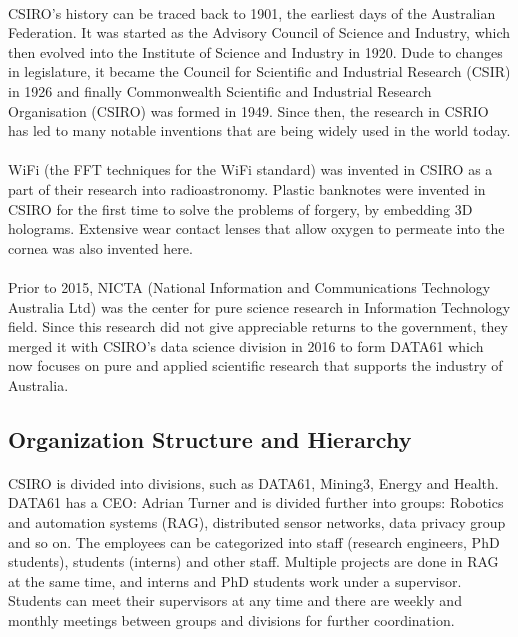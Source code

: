 \paragraph{}
CSIRO's history can be traced back to 1901, the earliest days of the Australian Federation. It was started as the Advisory Council of Science and Industry, which then evolved into the Institute of Science and Industry in 1920. Dude to changes in legislature, it became the Council for Scientific and Industrial Research (CSIR) in 1926 and finally Commonwealth Scientific and Industrial Research Organisation (CSIRO) was formed in 1949. Since then, the research in CSRIO has led to many notable inventions that are being widely used in the world today.

\paragraph{}
WiFi (the FFT techniques for the WiFi standard) was invented in CSIRO as a part of their research into radioastronomy. Plastic banknotes were invented in CSIRO for the first time to solve the problems of forgery, by embedding 3D holograms. Extensive wear contact lenses that allow oxygen to permeate into the cornea was also invented here. 

\paragraph{}
Prior to 2015, NICTA (National Information and Communications Technology Australia Ltd) was the center for pure science research in Information Technology field. Since this research did not give appreciable returns to the government, they merged it with CSIRO's data science division in 2016 to form DATA61 which now focuses on pure and applied scientific research that supports the industry of Australia.

\subsection{Organization Structure and Hierarchy}

\paragraph{}
CSIRO is divided into divisions, such as DATA61, Mining3, Energy and Health. DATA61 has a CEO: Adrian Turner and is divided further into groups: Robotics and automation systems (RAG), distributed sensor networks, data privacy group and so on. The employees can be categorized into staff (research engineers, PhD students), students (interns) and other staff. Multiple projects are done in RAG at the same time, and interns and PhD students work under a supervisor. Students can meet their supervisors at any time and there are weekly and monthly meetings between groups and divisions for further coordination.

